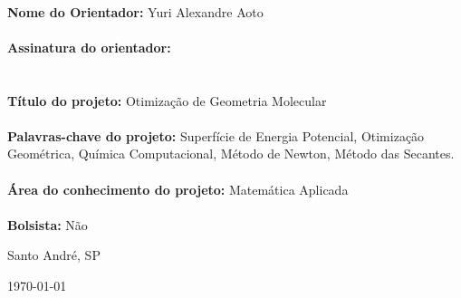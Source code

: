 \\
\textbf{Nome do Orientador:} Yuri Alexandre Aoto
\\
\\
\textbf{Assinatura do orientador:}
\\
\\
\\
\textbf{Título do projeto:} Otimização de Geometria Molecular
\\
\\
\textbf{Palavras-chave do projeto:} Superfície de Energia Potencial, Otimização Geométrica, Química
Computacional, Método de Newton, Método das Secantes. 
\\
\\
\textbf{Área do conhecimento do projeto:} Matemática Aplicada
\\
\\
\textbf{Bolsista:} Não
\\

\vfill
	
\begin{center}
  {\large Santo André, SP \par}	
  {\large \today \par}
\end{center}
